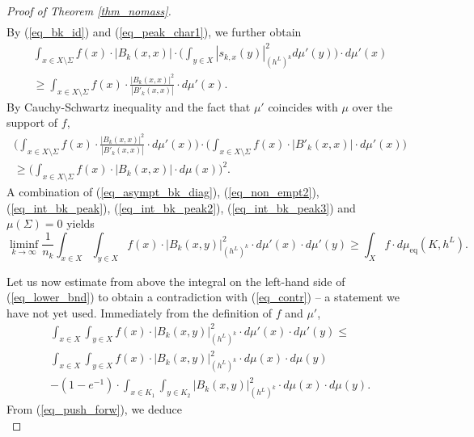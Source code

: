 \documentclass[12pt]{article}
\numberwithin{equation}{section}
\theoremstyle{theorem}
\theoremstyle{definition}
\theoremstyle{remark}
\begin{document}
\begin{proof}[Proof of Theorem \ref{thm_nomass}]
\begin{multline}
		\end{multline}
		By (\ref{eq_bk_id}) and (\ref{eq_peak_char1}), we further obtain 
		\begin{multline}\label{eq_int_bk_peak2}
			\int_{x \in X \setminus \Sigma} f(x) \cdot |B_k(x, x)| \cdot \Big( \int_{y \in X} |s_{k, x}(y)|^2_{(h^L)^k} d \mu'(y) \Big) \cdot d \mu'(x)
			\\
			\geq
			\int_{x \in X \setminus \Sigma} f(x) \cdot \frac{|B_k(x, x)|^2}{|B'_k(x, x)|} \cdot d \mu'(x).
		\end{multline}
		By Cauchy-Schwartz inequality and the fact that $\mu'$ coincides with $\mu$ over the support of $f$,
		\begin{multline}\label{eq_int_bk_peak3}
			\Big( \int_{x \in X \setminus \Sigma} f(x) \cdot \frac{|B_k(x, x)|^2}{|B'_k(x, x)|} \cdot d \mu'(x) \Big)
			\cdot
			\Big(
			\int_{x \in X \setminus \Sigma} f(x) \cdot |B'_k(x, x)| \cdot d \mu'(x)
			\Big)
			\\
			\geq
			\Big( \int_{x \in X \setminus \Sigma} f(x) \cdot |B_k(x, x)| \cdot d \mu(x) \Big)^2.
		\end{multline}
		A combination of (\ref{eq_asympt_bk_diag}), (\ref{eq_non_empt2}), (\ref{eq_int_bk_peak}), (\ref{eq_int_bk_peak2}), (\ref{eq_int_bk_peak3}) and $\mu(\Sigma) = 0$ yields
		\begin{equation}\label{eq_lower_bnd}
			\liminf_{k \to \infty}
			\frac{1}{n_k}
			\int_{x \in X} \int_{y \in X} f(x) \cdot |B_k(x, y)|^{2}_{(h^L)^k} \cdot d \mu'(x) \cdot d \mu'(y)
			\geq
			\int_{X} f \cdot d \mu_{\mathrm{eq}}(K, h^L).
		\end{equation}
		\par 
		Let us now estimate from above the integral on the left-hand side of (\ref{eq_lower_bnd}) to obtain a contradiction with (\ref{eq_contr}) -- a statement we have not yet used.
		Immediately from the definition of $f$ and $\mu'$,
		\begin{multline}\label{eq_upp_bnd1}
			\int_{x \in X} \int_{y \in X} f(x) \cdot |B_k(x, y)|^{2}_{(h^L)^k} \cdot d \mu'(x) \cdot d \mu'(y)
			\leq
			\\
			\int_{x \in X} \int_{y \in X} f(x) \cdot |B_k(x, y)|^{2}_{(h^L)^k} \cdot d \mu(x) \cdot d \mu(y)
			\\
			-
			(1 - e^{-1}) \cdot \int_{x \in K_1} \int_{y \in K_2} |B_k(x, y)|^{2}_{(h^L)^k} \cdot d \mu(x) \cdot d \mu(y).
		\end{multline}
		From (\ref{eq_push_forw}), we deduce
		\begin{equation}\label{eq_upp_bnd2}

\end{equation}
\end{proof}
\end{document}
